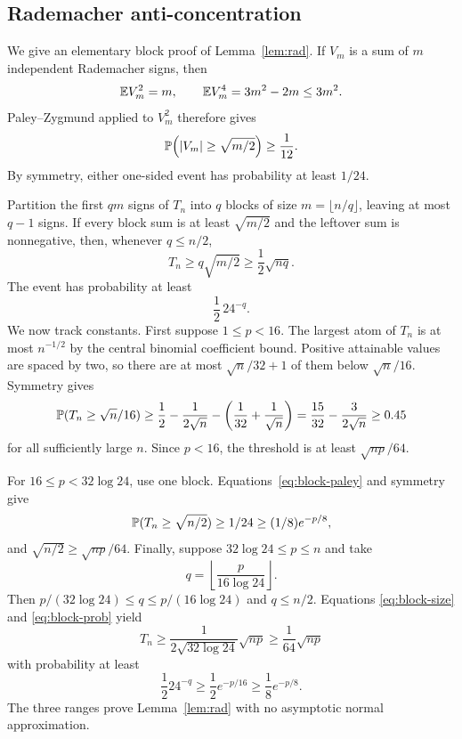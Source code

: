 \subsection{Rademacher anti-concentration}\label{app:anti}

We give an elementary block proof of Lemma~\ref{lem:rad}. If $V_m$ is a sum of $m$ independent
Rademacher signs, then
\[
 \mathbb E V_m^2=m,
 \qquad
 \mathbb E V_m^4=3m^2-2m\le3m^2.
\]
Paley--Zygmund applied to $V_m^2$ therefore gives
\begin{equation}
 \mathbb P\!\left(|V_m|\ge\sqrt{m/2}\right)\ge\frac1{12}.
 \label{eq:block-paley}
\end{equation}
By symmetry, either one-sided event has probability at least $1/24$.

Partition the first $qm$ signs of $T_n$ into $q$ blocks of size $m=\lfloor n/q\rfloor$, leaving
at most $q-1$ signs. If every block sum is at least $\sqrt{m/2}$ and the leftover sum is
nonnegative, then, whenever $q\le n/2$,
\begin{equation}
 T_n\ge q\sqrt{m/2}\ge\frac12\sqrt{nq}.
 \label{eq:block-size}
\end{equation}
The event has probability at least
\begin{equation}
 \frac12\,24^{-q}.
 \label{eq:block-prob}
\end{equation}
We now track constants. First suppose $1\le p<16$. The largest atom of $T_n$ is at most
$n^{-1/2}$ by the central binomial coefficient bound. Positive attainable values are spaced by
two, so there are at most $\sqrt n/32+1$ of them below $\sqrt n/16$. Symmetry gives
\begin{equation}
 \mathbb P(T_n\ge\sqrt n/16)
 \ge\frac12-\frac{1}{2\sqrt n}-\left(\frac1{32}+\frac1{\sqrt n}\right)
 =\frac{15}{32}-\frac{3}{2\sqrt n}\ge0.45
 \label{eq:small-rad}
\end{equation}
for all sufficiently large $n$. Since $p<16$, the threshold is at least
$\sqrt{np}/64$.

For $16\le p<32\log24$, use one block. Equations~\eqref{eq:block-paley} and symmetry give
\[
 \mathbb P(T_n\ge\sqrt{n/2})\ge1/24\ge(1/8)e^{-p/8},
\]
and $\sqrt{n/2}\ge\sqrt{np}/64$. Finally, suppose $32\log24\le p\le n$ and take
\[
 q=\left\lfloor\frac{p}{16\log24}\right\rfloor.
\]
Then $p/(32\log24)\le q\le p/(16\log24)$ and $q\le n/2$. Equations
\eqref{eq:block-size} and \eqref{eq:block-prob} yield
\[
 T_n\ge\frac{1}{2\sqrt{32\log24}}\sqrt{np}
 \ge\frac1{64}\sqrt{np}
\]
with probability at least
\[
 \frac12 24^{-q}\ge\frac12e^{-p/16}
 \ge\frac18e^{-p/8}.
\]
The three ranges prove Lemma~\ref{lem:rad} with no asymptotic normal approximation.

